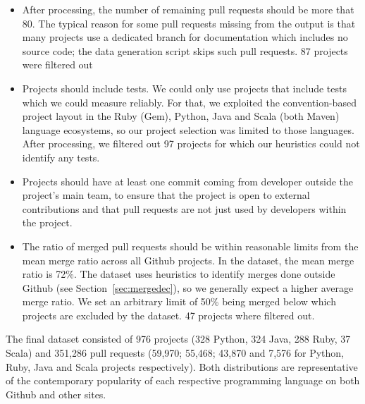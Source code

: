 \documentclass{sig-alternate}
\begin{document}
\begin{itemize}

  \item After processing, the number of remaining pull requests should be more
    that 80. The typical reason for some pull requests missing from the output
    is that many projects use a dedicated branch for documentation which
    includes no source code; the data generation script skips such pull
    requests.  87 projects were filtered out

  \item Projects should include tests. We could only use projects that include
    tests which we could measure reliably. For that, we exploited the
    convention-based project layout in the Ruby (Gem), Python, Java and Scala
    (both Maven) language ecosystems, so our project selection was limited to
    those languages. After processing, we filtered out 97 projects for which
    our heuristics could not identify any tests.
    
  \item Projects should have at least one commit coming from developer outside
    the project's main team, to ensure that the project is open to external
    contributions and that pull requests are not just used by developers within
    the project.

  \item The ratio of merged pull requests should be within reasonable limits
    from the mean merge ratio across all Github projects. In the \ghtorrent
    dataset, the mean merge ratio is 72\%. The \pullreqs dataset uses heuristics
    to identify merges done outside Github (see Section~\ref{sec:mergedec}), so
    we generally expect a higher average merge ratio. We set an arbitrary limit
    of 50\% being merged below which projects are excluded by the dataset. 47
    projects where filtered out.

\end{itemize}

The final dataset consisted of 976 projects (328 Python, 324 Java, 288 Ruby, 37
Scala) and 351,286 pull requests (59,970; 55,468; 43,870 and 7,576 for Python,
Ruby, Java and Scala projects respectively). Both distributions are
representative of the contemporary popularity of each respective programming
language on both Github and other sites.

%
%
\end{document}
